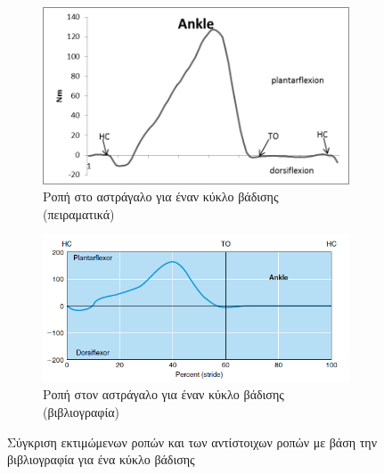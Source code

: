 \begin{figure}[H]
    \centering
    \begin{subfigure}[t]{.48\textwidth}
        \includegraphics[width=\textwidth, keepaspectratio]{fig/id-ankle.png}
        \caption{Ροπή στο αστράγαλο για έναν κύκλο βάδισης (πειραματικά)}
        \label{fig:ankle-moment}
    \end{subfigure}
    \begin{subfigure}[t]{.48\textwidth}
        \includegraphics[width=\textwidth, keepaspectratio]{fig/id-ankle-ref.png}
        \caption{Ροπή στον αστράγαλο για έναν κύκλο βάδισης (βιβλιογραφία)}
        \label{fig:ankle-moment-ref}
    \end{subfigure}
    \caption{Σύγκριση εκτιμώμενων ροπών και των αντίστοιχων ροπών με βάση την βιβλιογραφία \cite{whittlesey} για ένα κύκλο βάδισης}
    \label{fig:id-hip-knee-ankle-moments}
\end{figure}

